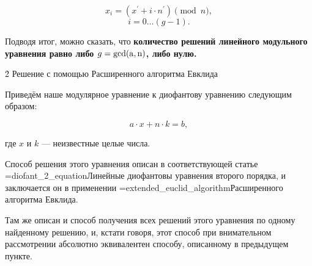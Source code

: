 $$x_i = (x^\prime + i \cdot n^\prime) \pmod n,$$
$$i = 0 \ldots (g-1).$$

Подводя итог, можно сказать, что \bf{количество решений} линейного модульного уравнения равно либо $g = {\rm gcd(a,n)}$, либо нулю.

\h2{ Решение с помощью Расширенного алгоритма Евклида }

Приведём наше модулярное уравнение к диофантову уравнению следующим образом:

$$a \cdot x + n \cdot k = b,$$

где $x$ и $k$ --- неизвестные целые числа.

Способ решения этого уравнения описан в соответствующей статье \algohref=diofant_2_equation{Линейные диофантовы уравнения второго порядка}, и заключается он в применении \algohref=extended_euclid_algorithm{Расширенного алгоритма Евклида}.

Там же описан и способ получения всех решений этого уравнения по одному найденному решению, и, кстати говоря, этот способ при внимательном рассмотрении абсолютно эквивалентен способу, описанному в предыдущем пункте.
